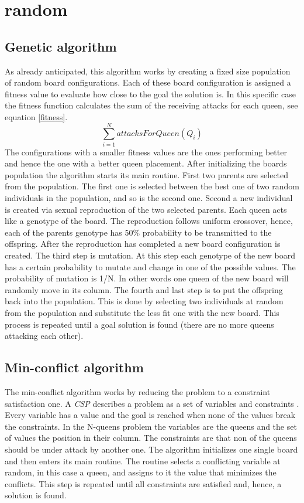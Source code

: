 \documentclass[runningheads]{llncs}
\begin{document}
\section{random}
\subsection{Genetic algorithm}
As already anticipated, this algorithm works by creating a fixed size population
of random board configurations. Each of these board configuration is
assigned a fitness value to evaluate how close to the goal the
solution is. In this specific case the fitness function calculates the
sum of the receiving attacks for each queen, see equation \ref{fitness}. 
\begin{equation} \label{fitness}
\sum_{i=1}^{N} attacksForQueen(Q_i)
\end{equation}
The configurations with a smaller fitness values are the ones
performing better and hence the one with a better queen
placement. After initializing the boards population the algorithm
starts its main routine. First two parents are selected from the population. The
first one is selected between the best one of two random individuals
in the population, and so is the second one. Second a new individual
is created via sexual reproduction of the two selected parents. Each
queen acts like a genotype of the board. The reproduction follows
uniform crossover, hence, each of the parents genotype has 50\%
probability to be transmitted to the offspring. After the reproduction
has completed a new board configuration is created. The third step is
mutation. At this step each genotype of the new board has a certain
probability to mutate and change in one of the possible values. The
probability of mutation is 1/N. In other words one queen of the new board
will randomly move in its column. The fourth and last step is to put
the offspring back into the population. This is done by selecting two
individuals at random from the population and substitute the less fit
one with the new board. This process is repeated until a goal solution
is found (there are no more queens attacking each other).

\subsection{Min-conflict algorithm}
The min-conflict algorithm works by reducing the problem to a
constraint satisfaction one. A \textit{CSP} describes a problem as a
set of variables and constraints \cite{russel2016artificial}. Every
variable has a value and the goal is reached when none of the values
break the constraints. In the N-queens problem the variables are the queens and
the set of values the position in their column. The constraints are
that non of the queens should be under attack by another one. The
algorithm initializes one single board and then enters its main
routine. The routine selects a conflicting variable at random, in this
case a queen, and assigns to it the value that minimizes the
conflicts. This step is repeated until all constraints are satisfied
and, hence, a solution is found.
\end{document}
